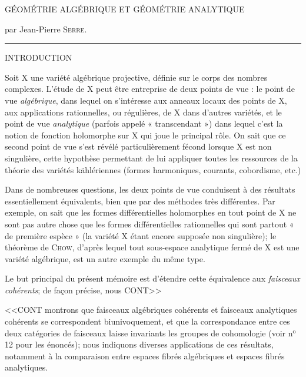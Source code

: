 


GÉOMÉTRIE ALGÉBRIQUE ET GÉOMÉTRIE ANALYTIQUE

par Jean-Pierre \textsc{Serre}.

\begin{center}\rule{2.5cm}{0.4pt}\end{center}


INTRODUCTION

Soit $\mathrm{X}$ une variété algébrique projective, définie sur le corps des nombres complexes. L'étude de $\mathrm{X}$ peut être entreprise de deux points de vue : le point de vue \textit{algébrique}, dans lequel on s'intéresse aux anneaux locaux des points de $\mathrm{X}$, aux applications rationnelles, ou régulières, de $\mathrm{X}$ dans d'autres variétés, et le point de vue \textit{analytique} (parfois appelé « transcendant ») dans lequel c'est la notion de fonction holomorphe sur $\mathrm{X}$ qui joue le principal rôle. On sait que ce second point de vue s'est révélé particulièrement fécond lorsque $\mathrm{X}$ est non singulière, cette hypothèse permettant de lui appliquer toutes les ressources de la théorie des variétés kählériennes (formes harmoniques, courants, cobordisme, etc.)

Dans de nombreuses questions, les deux points de vue conduisent à des résultats essentiellement équivalents, bien que par des méthodes très différentes. Par exemple, on sait que les formes différentielles holomorphes en tout point de $\mathrm{X}$ ne sont pas autre chose que les formes différentielles rationnelles qui sont partout « de première espèce » (la variété $\mathrm{X}$ étant encore supposée non singulière); le théorème de \textsc{Chow}, d'après lequel tout sous-espace analytique fermé de $\mathrm{X}$ est une variété algébrique, est un autre exemple du même type.

Le but principal du présent mémoire est d'étendre cette équivalence aux \textit{faisceaux cohérents}; de façon précise, nous CONT>>



<<CONT montrons que faisceaux algébriques cohérents et faisceaux analytiques cohérents se correspondent biunivoquement, et que la correspondance entre ces deux catégories de faisceaux laisse invariants les groupes de cohomologie (voir n$^{\mathrm{o}}$ 12 pour les énoncés); nous indiquons diverses applications de ces résultats, notamment à la comparaison entre espaces fibrés algébriques et espaces fibrés analytiques.

